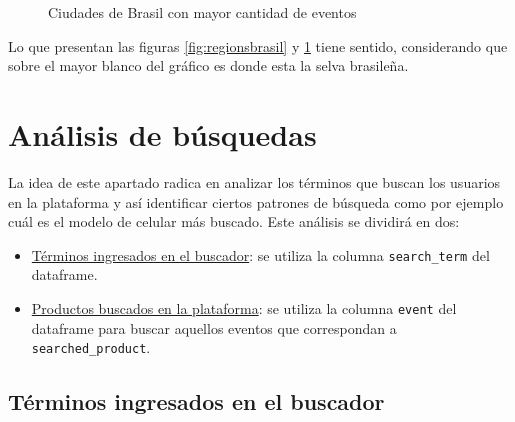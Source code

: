 \documentclass[a4paper]{article}
\begin{document}
\begin{figure}[h!]
	\caption{Ciudades de Brasil con mayor cantidad de eventos}
	\label{fig:citybrasil}
\end{figure}

Lo que presentan las figuras \ref{fig:regionsbrasil} y \ref{fig:citybrasil} tiene sentido, considerando que sobre el mayor blanco del gráfico es donde esta la selva brasileña.

\section{Análisis de búsquedas}

La idea de este apartado radica en analizar los términos que buscan los usuarios en la plataforma y así identificar ciertos patrones de búsqueda como por ejemplo cuál es el modelo de celular más buscado. Este análisis se dividirá en dos:

\begin{itemize}
	\item \underline{Términos ingresados en el buscador}: se utiliza la columna \texttt{search\_term} del dataframe.
	\item \underline{Productos buscados en la plataforma}: se utiliza la columna \texttt{event} del dataframe para buscar aquellos eventos que correspondan a \texttt{searched\_product}.
 \end{itemize}

\subsection{Términos ingresados en el buscador}
\end{document}
